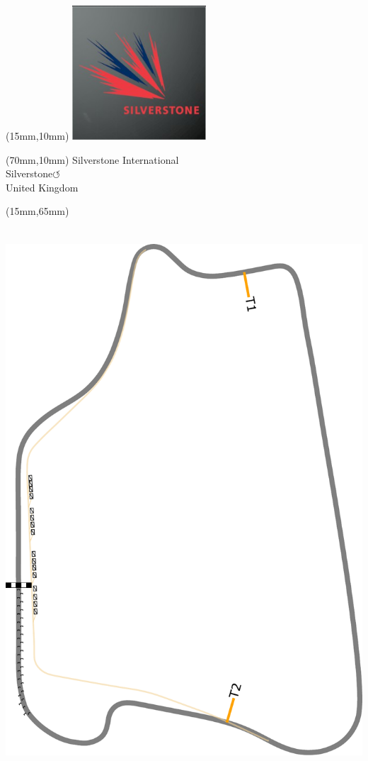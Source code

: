 \null\newpage
\begin{textblock*}{50mm}(15mm,10mm)%
\includegraphics[width=50mm]{LG/2015-05-20_00094.png}
\end{textblock*}
\begin{textblock*}{130mm}(70mm,10mm)%
{\fontsize{20}{20}\selectfont Silverstone International\\}
{\fontsize{16}{16}\selectfont Silverstone\hfill \huge$\circlearrowleft$\\}
{\fontsize{12}{12}\selectfont United Kingdom\\}
\end{textblock*}
\begin{textblock*}{185mm}(15mm,65mm)%
\centering
\mbox{\includegraphics[width=185mm,height=210mm,keepaspectratio]{PT/SIIN.pdf}}
\end{textblock*}
